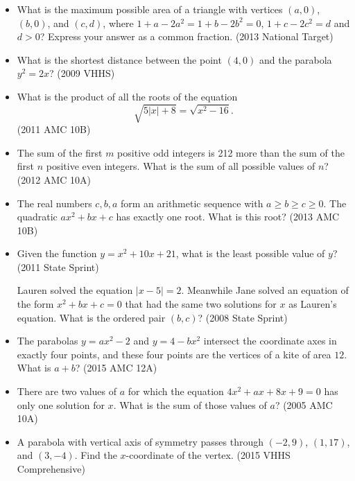 \documentclass{article}
\begin{document}
\begin{itemize}

\item What is the maximum possible area of a triangle with vertices $(a,0)$, $(b,0)$, and $(c,d)$, where $1+a-2a^2=1+b-2b^2=0$, $1+c-2c^2=d$ and $d>0$? Express your answer as a common fraction. (2013 National Target)

\item What is the shortest distance between the point $(4,0)$ and the parabola $y^2=2x$? (2009 VHHS)

\item What is the product of all the roots of the equation $$\sqrt{5 | x | + 8} = \sqrt{x^2 - 16}.$$ (2011 AMC 10B)

\item The sum of the first $m$ positive odd integers is 212 more than the sum of the first $n$ positive even integers. What is the sum of all possible values of $n$? (2012 AMC 10A)

\item The real numbers $c,b,a$ form an arithmetic sequence with $a\ge b\ge c\ge 0$. The quadratic $ax^2+bx+c$ has exactly one root. What is this root? (2013 AMC 10B)

\item Given the function $y=x^2+10x+21$, what is the least possible value of $y$? (2011 State Sprint)

Lauren solved the equation $|x-5|=2$. Meanwhile Jane solved an equation of the form $x^2+bx+c=0$ that had the same two solutions for $x$ as Lauren's equation. What is the ordered pair $(b,c)$? (2008 State Sprint)

\item The parabolas $y=ax^2-2$ and $y=4-bx^2$ intersect the coordinate axes in exactly four points, and these four points are the vertices of a kite of area $12$. What is $a+b$? (2015 AMC 12A)

\item There are two values of $a$ for which the equation $4x^2+ax+8x+9=0$ has only one solution for $x$. What is the sum of those values of $a$? (2005 AMC 10A)

\item A parabola with vertical axis of symmetry passes through $(-2,9)$, $(1,17)$, and $(3,-4)$. Find the $x$-coordinate of the vertex. (2015 VHHS Comprehensive)

\end{itemize}
\end{document}

